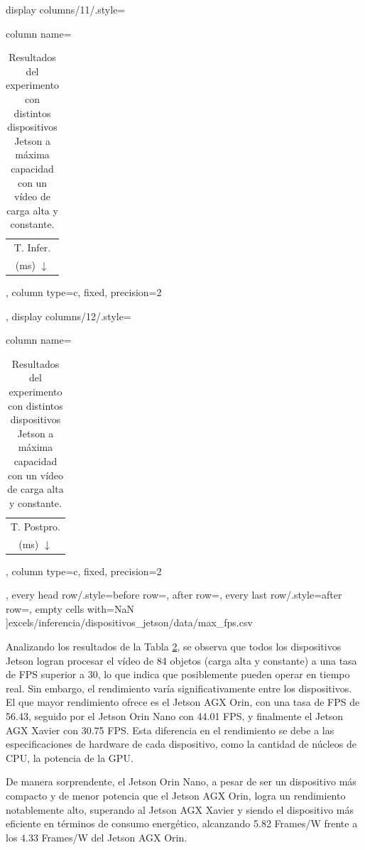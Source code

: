 \documentclass[11pt,spanish,listoffigures,listoftables]{tfgetsinf}
\begin{document}
\begin{table}[H]
{      display columns/11/.style={column name=\begin{tabular}[c]{@{}c@{}}T. Infer.\\(ms) $\downarrow$\end{tabular}, column type={c}, fixed, precision=2},
      display columns/12/.style={column name=\begin{tabular}[c]{@{}c@{}}T. Postpro.\\(ms) $\downarrow$\end{tabular}, column type={c}, fixed, precision=2},
      every head row/.style={before row=\toprule, after row=\midrule},
      every last row/.style={after row=\bottomrule},
      empty cells with={NaN}
      ]{excels/inferencia/dispositivos_jetson/data/max_fps.csv}
      }
      \caption[Resultados del experimento con distintos dispositivos Jetson a máxima capacidad con un vídeo de carga alta y constante]{Resultados del experimento con distintos dispositivos Jetson a máxima capacidad con un vídeo de carga alta y constante.}
      \label{tab:experimento_dispositivos_jetson_max_fps_carga_alta_constante}
\end{table}


Analizando los resultados de la Tabla \ref{tab:experimento_dispositivos_jetson_max_fps_carga_alta_constante}, se observa que todos los dispositivos Jetson logran procesar el vídeo de 84 objetos (carga alta y constante) a una tasa de FPS superior a 30, lo que indica que posiblemente pueden operar en tiempo real. Sin embargo, el rendimiento varía significativamente entre los dispositivos. El que mayor rendimiento ofrece es el Jetson AGX Orin, con una tasa de FPS de 56.43, seguido por el Jetson Orin Nano con 44.01 FPS, y finalmente el Jetson AGX Xavier con 30.75 FPS. Esta diferencia en el rendimiento se debe a las especificaciones de hardware de cada dispositivo, como la cantidad de núcleos de CPU, la potencia de la GPU. 

De manera sorprendente, el Jetson Orin Nano, a pesar de ser un dispositivo más compacto y de menor potencia que el Jetson AGX Orin, logra un rendimiento notablemente alto, superando al Jetson AGX Xavier y siendo el dispositivo más eficiente en términos de consumo energético, alcanzando 5.82 Frames/W frente a los 4.33 Frames/W del Jetson AGX Orin.
\end{document}
